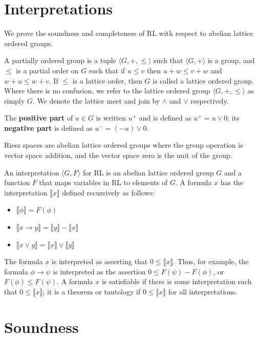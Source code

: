 \documentclass[preprint,leqno]{elsarticle}
\newcommand{\interp}[1]{\llbracket #1 \rrbracket}
\begin{document}
\section{Interpretations}

We prove the soundness and completeness of RL with respect to
abelian lattice ordered groups.

\begin{definition}
  A partially ordered group is a tuple $\langle G, +, \le\rangle$ such
  that $\langle G, +\rangle$ is a group, and $\le$ is a partial order
  on $G$ such that if $u \le v$ then $u + w \le v + w$ and $w + u \le
  w + v$. If $\le$ is a lattice order, then $G$ is called a lattice
  ordered group. Where there is no confusion, we refer to the lattice
  ordered group $\langle G, +, \le\rangle$ as simply $G$. We denote
  the lattice meet and join by $\land$ and $\lor$ respectively.

  The \textbf{positive part} of $u\in G$ is written $u^+$ and is defined
  as $u^+ = u\lor 0$; its \textbf{negative part} is defined as $u^- =
  (-u)\lor 0$.
\end{definition}

Riesz spaces are abelian lattice ordered groups where the group
operation is vector space addition, and the vector space zero is the
unit of the group.

An interpretation $\langle G, F\rangle$ for RL is an abelian lattice
ordered group $G$ and a function $F$ that maps variables in RL to
elements of $G$. A formula $x$ has the interpretation $\interp{x}$
defined recursively as follows:
\begin{itemize}
\item $\interp{\phi} = F(\phi)$
\item $\interp{x \rightarrow y} = \interp{y} - \interp{x}$
\item $\interp{x \lor y} = \interp{x} \lor \interp{y}$
\end{itemize}
The formula $x$ is interpreted as asserting that $0 \le
\interp{x}$. Thus, for example, the formula $\phi \rightarrow \psi$ is
interpreted as the assertion $0 \le F(\psi) - F(\phi)$, or $F(\phi)
\le F(\psi)$. A formula $x$ is satisfiable if there is some
interpretation such that $0 \le \interp{x}$; it is a theorem or
tautology if $0 \le \interp{x}$ for all interpretations.

\section{Soundness}
\end{document}

